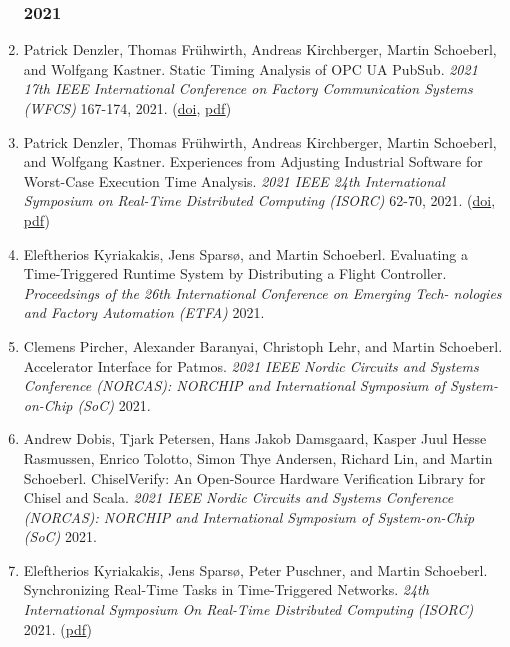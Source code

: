 \begin{enumerate}

\subsubsection*{2021}

\item Patrick Denzler, Thomas Fr\"uhwirth, Andreas Kirchberger, Martin Schoeberl, and Wolfgang Kastner.
 Static Timing Analysis of OPC UA PubSub.
 \emph{2021 17th IEEE International Conference on Factory Communication Systems (WFCS)} 167-174, 2021.
(\href{http://dx.doi.org/10.1109/WFCS46889.2021.9483614}{doi}, \href{https://www.jopdesign.com/doc/OPC_UA_Pub_Sub_WCET.pdf}{pdf})

\item Patrick Denzler, Thomas Fr\"uhwirth, Andreas Kirchberger, Martin Schoeberl, and Wolfgang Kastner.
 Experiences from Adjusting Industrial Software for Worst-Case Execution Time Analysis.
 \emph{2021 IEEE 24th International Symposium on Real-Time Distributed Computing (ISORC)} 62-70, 2021.
(\href{http://dx.doi.org/10.1109/ISORC52013.2021.00019}{doi}, \href{https://www.jopdesign.com/doc/industswwcet.pdf}{pdf})

\item Eleftherios Kyriakakis, Jens Spars{\o}, and Martin Schoeberl.
 Evaluating a Time-Triggered Runtime System by Distributing a Flight Controller.
 \emph{Proceedsings of the 26th International Conference on Emerging Tech- nologies and Factory Automation (ETFA)} 2021.


\item Clemens Pircher, Alexander Baranyai, Christoph Lehr, and Martin Schoeberl.
 Accelerator Interface for Patmos.
 \emph{2021 IEEE Nordic Circuits and Systems Conference (NORCAS): NORCHIP and International Symposium of System-on-Chip (SoC)} 2021.


\item Andrew Dobis, Tjark Petersen, Hans Jakob Damsgaard, Kasper Juul Hesse Rasmussen, Enrico Tolotto, Simon Thye Andersen, Richard Lin, and Martin Schoeberl.
 ChiselVerify: An Open-Source Hardware Verification Library for Chisel and Scala.
 \emph{2021 IEEE Nordic Circuits and Systems Conference (NORCAS): NORCHIP and International Symposium of System-on-Chip (SoC)} 2021.


\item Eleftherios Kyriakakis, Jens Spars{\o}, Peter Puschner, and Martin Schoeberl.
 Synchronizing Real-Time Tasks in Time-Triggered Networks.
 \emph{24th International Symposium On Real-Time Distributed Computing (ISORC)} 2021.
(\href{https://www.jopdesign.com/doc/ttetask.pdf}{pdf})


\end{enumerate}
